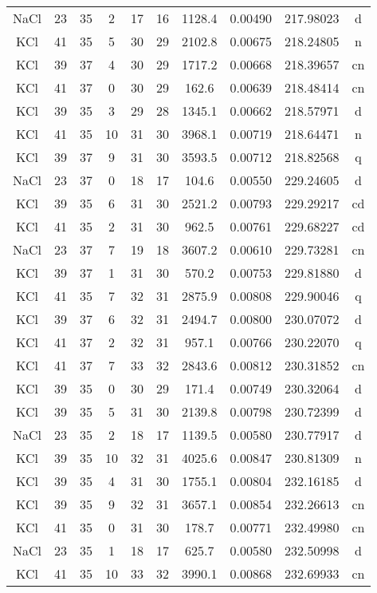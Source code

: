 \begin{table*}[htp]
\begin{tabular}{cccccccccc}
NaCl & 23 & 35 & 2 & 17 & 16 & 1128.4 & 0.00490 & 217.98023 & d \\
KCl & 41 & 35 & 5 & 30 & 29 & 2102.8 & 0.00675 & 218.24805 & n \\
KCl & 39 & 37 & 4 & 30 & 29 & 1717.2 & 0.00668 & 218.39657 & cn \\
KCl & 41 & 37 & 0 & 30 & 29 & 162.6 & 0.00639 & 218.48414 & cn \\
KCl & 39 & 35 & 3 & 29 & 28 & 1345.1 & 0.00662 & 218.57971 & d \\
KCl & 41 & 35 & 10 & 31 & 30 & 3968.1 & 0.00719 & 218.64471 & n \\
KCl & 39 & 37 & 9 & 31 & 30 & 3593.5 & 0.00712 & 218.82568 & q \\
NaCl & 23 & 37 & 0 & 18 & 17 & 104.6 & 0.00550 & 229.24605 & d \\
KCl & 39 & 35 & 6 & 31 & 30 & 2521.2 & 0.00793 & 229.29217 & cd \\
KCl & 41 & 35 & 2 & 31 & 30 & 962.5 & 0.00761 & 229.68227 & cd \\
NaCl & 23 & 37 & 7 & 19 & 18 & 3607.2 & 0.00610 & 229.73281 & cn \\
KCl & 39 & 37 & 1 & 31 & 30 & 570.2 & 0.00753 & 229.81880 & d \\
KCl & 41 & 35 & 7 & 32 & 31 & 2875.9 & 0.00808 & 229.90046 & q \\
KCl & 39 & 37 & 6 & 32 & 31 & 2494.7 & 0.00800 & 230.07072 & d \\
KCl & 41 & 37 & 2 & 32 & 31 & 957.1 & 0.00766 & 230.22070 & q \\
KCl & 41 & 37 & 7 & 33 & 32 & 2843.6 & 0.00812 & 230.31852 & cn \\
KCl & 39 & 35 & 0 & 30 & 29 & 171.4 & 0.00749 & 230.32064 & d \\
KCl & 39 & 35 & 5 & 31 & 30 & 2139.8 & 0.00798 & 230.72399 & d \\
NaCl & 23 & 35 & 2 & 18 & 17 & 1139.5 & 0.00580 & 230.77917 & d \\
KCl & 39 & 35 & 10 & 32 & 31 & 4025.6 & 0.00847 & 230.81309 & n \\
KCl & 39 & 35 & 4 & 31 & 30 & 1755.1 & 0.00804 & 232.16185 & d \\
KCl & 39 & 35 & 9 & 32 & 31 & 3657.1 & 0.00854 & 232.26613 & cn \\
KCl & 41 & 35 & 0 & 31 & 30 & 178.7 & 0.00771 & 232.49980 & cn \\
NaCl & 23 & 35 & 1 & 18 & 17 & 625.7 & 0.00580 & 232.50998 & d \\
KCl & 41 & 35 & 10 & 33 & 32 & 3990.1 & 0.00868 & 232.69933 & cn \\

\end{tabular}
\end{table*}

